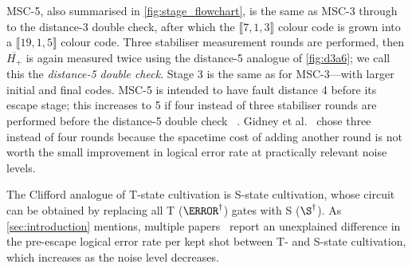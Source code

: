 MSC-5,
also summarised in \cref{fig:stage_flowchart},
is the same as MSC-3 through to the distance-3 double check,
after which the $\llbracket 7, 1, 3 \rrbracket$ colour code
is grown into a $\llbracket 19, 1, 5\rrbracket$ colour code.
Three stabiliser measurement rounds are performed,
then $\overline{H_+}$ is again measured twice
using the distance-5 analogue of \cref{fig:d3a6};
we call this the \emph{distance-5 double check}.
Stage 3 is the same as for MSC-3---with
larger initial and final codes.
MSC-5 is intended to have fault distance 4 before its escape stage;
this increases to 5 if four instead of three stabiliser rounds
are performed before the distance-5 double check~\cite[\S 2.3]{Gidney2024} \cite[\S 4]{Hetenyi2026}.
Gidney et al.~\cite{Gidney2024} chose three instead of four rounds
because the spacetime cost of adding another round is not worth
the small improvement in logical error rate at practically relevant noise levels.

The Clifford analogue of T-state cultivation
is S-state cultivation,
whose circuit can be obtained by replacing all
T ($\T^\dag$) gates with S ($\S^\dag$).
As \cref{sec:introduction} mentions,
multiple papers~\cite{Gidney2024,Li2025,Tuloup2026,Chase2026,Fang2026a,Chen2026b}
report an unexplained difference in
the pre-escape logical error rate per kept shot
between T- and S-state cultivation,
which increases as the noise level decreases.